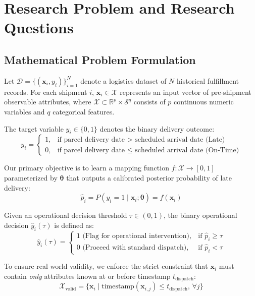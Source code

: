 \documentclass[journal,10pt,twocolumn]{IEEEtran}
\begin{document}
\section{Research Problem and Research Questions}
\label{sec:problem_formulation}

\subsection{Mathematical Problem Formulation}
Let $\mathcal{D} = \{(\mathbf{x}_i, y_i)\}_{i=1}^N$ denote a logistics dataset of $N$ historical fulfillment records. For each shipment $i$, $\mathbf{x}_i \in \mathcal{X}$ represents an input vector of pre-shipment observable attributes, where $\mathcal{X} \subset \mathbb{R}^p \times \mathcal{S}^q$ consists of $p$ continuous numeric variables and $q$ categorical features.

The target variable $y_i \in \{0, 1\}$ denotes the binary delivery outcome:
\begin{equation}
y_i = \begin{cases}
1, & \text{if parcel delivery date } > \text{ scheduled arrival date (Late)} \\
0, & \text{if parcel delivery date } \le \text{ scheduled arrival date (On-Time)}
\end{cases}
\label{eq:target}
\end{equation}

Our primary objective is to learn a mapping function $f: \mathcal{X} \to [0, 1]$ parameterized by $\boldsymbol{\theta}$ that outputs a calibrated posterior probability of late delivery:
\begin{equation}
\hat{p}_i = P(y_i = 1 \mid \mathbf{x}_i; \boldsymbol{\theta}) = f(\mathbf{x}_i)
\label{eq:probability}
\end{equation}

Given an operational decision threshold $\tau \in (0, 1)$, the binary operational decision $\hat{y}_i(\tau)$ is defined as:
\begin{equation}
\hat{y}_i(\tau) = \begin{cases}
1 \text{ (Flag for operational intervention)}, & \text{if } \hat{p}_i \ge \tau \\
0 \text{ (Proceed with standard dispatch)}, & \text{if } \hat{p}_i < \tau
\end{cases}
\label{eq:threshold_rule}
\end{equation}

To ensure real-world validity, we enforce the strict constraint that $\mathbf{x}_i$ must contain \emph{only} attributes known at or before timestamp $t_{\text{dispatch}}$:
\begin{equation}
\mathcal{X}_{\text{valid}} = \{\mathbf{x}_i \mid \text{timestamp}(\mathbf{x}_{i, j}) \le t_{\text{dispatch}}, \, \forall j\}
\label{eq:leakage_constraint}
\end{equation}
\end{document}
